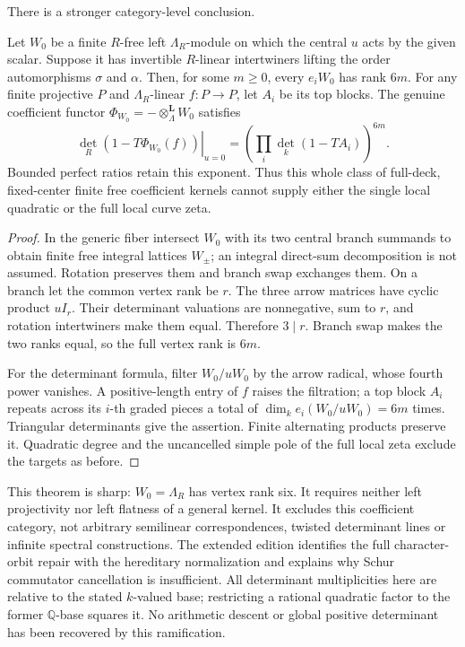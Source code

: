 There is a stronger category-level conclusion.
\begin{theorem}\label{thm:full-deck-kernel}
Let $W_0$ be a finite $R$-free left $\Lambda_R$-module on which the central $u$ acts by the given scalar. Suppose it has invertible $R$-linear intertwiners lifting the order automorphisms $\sigma$ and $\alpha$. Then, for some $m\ge0$, every $e_iW_0$ has rank $6m$. For any finite projective $P$ and $\Lambda_R$-linear $f:P\to P$, let $A_i$ be its top blocks. The genuine coefficient functor $\Phi_{W_0}= -\otimes_\Lambda^{\mathbf L} W_0$ satisfies
\[
 \left.\det_R(1-T\Phi_{W_0}(f))\right|_{u=0}
 =\left(\prod_i\det_k(1-TA_i)\right)^{6m}.
\]
Bounded perfect ratios retain this exponent. Thus this whole class of full-deck, fixed-center finite free coefficient kernels cannot supply either the single local quadratic or the full local curve zeta.
\end{theorem}
\begin{proof}
In the generic fiber intersect $W_0$ with its two central branch summands to obtain finite free integral lattices $W_\pm$; an integral direct-sum decomposition is not assumed. Rotation preserves them and branch swap exchanges them. On a branch let the common vertex rank be $r$. The three arrow matrices have cyclic product $uI_r$. Their determinant valuations are nonnegative, sum to $r$, and rotation intertwiners make them equal. Therefore $3\mid r$. Branch swap makes the two ranks equal, so the full vertex rank is $6m$.

For the determinant formula, filter $W_0/uW_0$ by the arrow radical, whose fourth power vanishes. A positive-length entry of $f$ raises the filtration; a top block $A_i$ repeats across its $i$-th graded pieces a total of $\dim_k e_i(W_0/uW_0)=6m$ times. Triangular determinants give the assertion. Finite alternating products preserve it. Quadratic degree and the uncancelled simple pole of the full local zeta exclude the targets as before.
\end{proof}
This theorem is sharp: $W_0=\Lambda_R$ has vertex rank six. It requires neither left projectivity nor left flatness of a general kernel. It excludes this coefficient category, not arbitrary semilinear correspondences, twisted determinant lines or infinite spectral constructions. The extended edition identifies the full character-orbit repair with the hereditary normalization and explains why Schur commutator cancellation is insufficient. All determinant multiplicities here are relative to the stated $k$-valued base; restricting a rational quadratic factor to the former $\mathbb Q$-base squares it. No arithmetic descent or global positive determinant has been recovered by this ramification.


